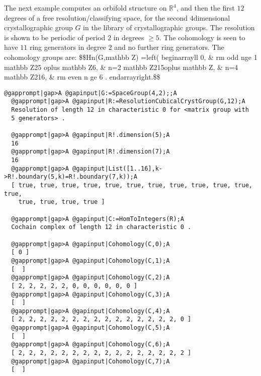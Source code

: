 \documentclass[a4paper,11pt]{report}
\begin{document}
{{\begin{Verbatim}[commandchars=!@|,fontsize=\small,frame=single,label=Example]
\end{Verbatim}
 The next example computes an orbifold structure on $\mathbb R^4$, and then the first $12$ degrees of a free resolution/classifying space, for the second $4$\texttt{}dimensional crystallographic group $G$ in the library of crystallographic groups. The resolution is shown to be
periodic of period $2$ in degrees $\ge 5$. The cohomology is seen to have $11$ ring generators in degree $2$ and no further ring generators. The cohomology groups are:
\$\$H\texttt{}n(G,\texttt{}mathbb Z)
=\texttt{}left(
\texttt{}begin\texttt{}array\texttt{}\texttt{}ll\texttt{}
0, \& \texttt{}\texttt{}rm
odd\texttt{}\texttt{} n\texttt{}ge
1\texttt{}\texttt{} \texttt{}mathbb
Z{\textunderscore}2\texttt{}5 \texttt{}oplus
\texttt{}mathbb Z\texttt{}6, \&
n=2\texttt{}\texttt{} \texttt{}mathbb
Z{\textunderscore}2\texttt{}\texttt{}15\texttt{}\texttt{}oplus
\texttt{}mathbb Z, \& n=4\texttt{}\texttt{}
\texttt{}mathbb
Z{\textunderscore}2\texttt{}\texttt{}16\texttt{},
\& \texttt{}\texttt{}rm
even\texttt{}\texttt{} n \texttt{}ge 6
.\texttt{}\texttt{}
\texttt{}end\texttt{}array\texttt{}\texttt{}right.\$\$ 
\begin{Verbatim}[commandchars=@|A,fontsize=\small,frame=single,label=Example]
  @gapprompt|gap>A @gapinput|G:=SpaceGroup(4,2);;A
  @gapprompt|gap>A @gapinput|R:=ResolutionCubicalCrystGroup(G,12);A
  Resolution of length 12 in characteristic 0 for <matrix group with 
  5 generators> . 
  
  @gapprompt|gap>A @gapinput|R!.dimension(5);A
  16
  @gapprompt|gap>A @gapinput|R!.dimension(7);A
  16
  @gapprompt|gap>A @gapinput|List([1..16],k->R!.boundary(5,k)=R!.boundary(7,k));A
  [ true, true, true, true, true, true, true, true, true, true, true, true, 
    true, true, true, true ]
  
  @gapprompt|gap>A @gapinput|C:=HomToIntegers(R);A
  Cochain complex of length 12 in characteristic 0 . 
  
  @gapprompt|gap>A @gapinput|Cohomology(C,0);A
  [ 0 ]
  @gapprompt|gap>A @gapinput|Cohomology(C,1);A
  [  ]
  @gapprompt|gap>A @gapinput|Cohomology(C,2);A
  [ 2, 2, 2, 2, 2, 0, 0, 0, 0, 0, 0 ]
  @gapprompt|gap>A @gapinput|Cohomology(C,3);A
  [  ]
  @gapprompt|gap>A @gapinput|Cohomology(C,4);A
  [ 2, 2, 2, 2, 2, 2, 2, 2, 2, 2, 2, 2, 2, 2, 2, 0 ]
  @gapprompt|gap>A @gapinput|Cohomology(C,5);A
  [  ]
  @gapprompt|gap>A @gapinput|Cohomology(C,6);A
  [ 2, 2, 2, 2, 2, 2, 2, 2, 2, 2, 2, 2, 2, 2, 2, 2 ]
  @gapprompt|gap>A @gapinput|Cohomology(C,7);A
  [  ]
  

\end{Verbatim}}}
\end{document}
